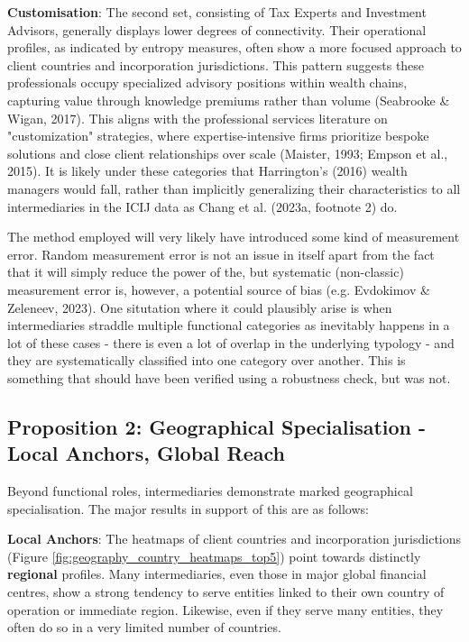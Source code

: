 \textbf{Customisation}: The second set, consisting of Tax Experts and Investment Advisors, generally displays lower degrees of connectivity. Their operational profiles, as indicated by entropy measures, often show a more focused approach to client countries and incorporation jurisdictions. This pattern suggests these professionals occupy specialized advisory positions within wealth chains, capturing value through knowledge premiums rather than volume (Seabrooke \& Wigan, 2017). This aligns with the professional services literature on "customization" strategies, where expertise-intensive firms prioritize bespoke solutions and close client relationships over scale (Maister, 1993; Empson et al., 2015). It is likely under these categories that Harrington's (2016) wealth managers would fall, rather than implicitly generalizing their characteristics to all intermediaries in the ICIJ data as Chang et al. (2023a, footnote 2) do.

The method employed will very likely have introduced some kind of measurement error. Random measurement error is not an issue in itself apart from the fact that it will simply reduce the power of the, but systematic (non-classic) measurement error is, however, a potential source of bias (e.g. Evdokimov \& Zeleneev, 2023). One situtation where it could plausibly arise is when intermediaries straddle multiple functional categories as inevitably happens in a lot of these cases - there is even a lot of overlap in the underlying typology - and they are systematically classified into one category over another. This is something that should have been verified using a robustness check, but was not. 

\subsection{Proposition 2: Geographical Specialisation - Local Anchors, Global Reach}
\label{subsec:prop2_duality}

Beyond functional roles, intermediaries demonstrate marked geographical specialisation. The major results in support of this are as follows:

\textbf{Local Anchors}: The heatmaps of client countries and incorporation jurisdictions (Figure \ref{fig:geography_country_heatmaps_top5}) point towards distinctly \textbf{regional} profiles. Many intermediaries, even those in major global financial centres, show a strong tendency to serve entities linked to their own country of operation or immediate region. Likewise, even if they serve many entities, they often do so in a very limited number of countries.

